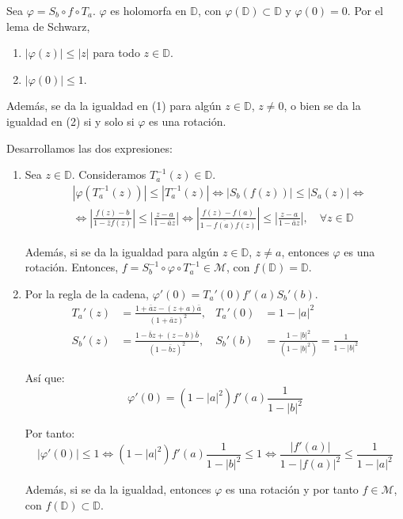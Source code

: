 Sea $\varphi = S_b \circ f \circ T_a$.
$\varphi$ es holomorfa en $\mathbb{D}$, con $\varphi(\mathbb{D}) \subset \mathbb{D}$ y $\varphi(0) = 0$.
Por el lema de Schwarz,
\begin{enumerate}
    \item $|\varphi(z)| \leq |z|$ para todo $z \in \mathbb{D}$.
    \item $|\varphi(0)| \leq 1$.
\end{enumerate}

Además, se da la igualdad en (1) para algún $z \in \mathbb{D}$, $z \neq 0$, o bien se da la igualdad en (2) si y solo si $\varphi$ es una rotación.

Desarrollamos las dos expresiones:
\begin{enumerate}
    \item Sea $z \in \mathbb{D}$.
          Consideramos $T_a^{-1}(z) \in \mathbb{D}$.
          \begin{align*}
               & |\varphi(T_a^{-1}(z))| \leq |T_a^{-1}(z)| \Leftrightarrow |S_b(f(z))| \leq |S_a(z)| \Leftrightarrow                                                                                                                                              \\
               & \Leftrightarrow \left|\frac{f(z)-b}{1-\bar{z}f(z)}\right| \leq \left|\frac{z-a}{1-\bar{a}z}\right| \Leftrightarrow \left|\frac{f(z)-f(a)}{1-\overline{f(a)}f(z)}\right| \leq \left|\frac{z-a}{1-\bar{a}z}\right|, \quad \forall z \in \mathbb{D}
          \end{align*}

          Además, si se da la igualdad para algún $z \in \mathbb{D}$, $z \neq a$, entonces $\varphi$ es una rotación.
          Entonces, $f = S_b^{-1} \circ \varphi \circ T_a^{-1} \in \mathcal{M}$, con $f(\mathbb{D}) = \mathbb{D}$.

    \item Por la regla de la cadena, $\varphi'(0) = T_a'(0) f'(a) S_b'(b)$.
          \begin{align*}
              T_a'(z) & = \frac{1 + \bar{a}z - (z+a)\bar{a}}{(1 + \bar{a}z)^2}, & T_a'(0) & = 1 - |a|^2                                     \\
              S_b'(z) & = \frac{1 - \bar{b}z + (z-b)\bar{b}}{(1 - \bar{b}z)^2}, & S_b'(b) & = \frac{1-|b|^2}{(1-|b|^2)} = \frac{1}{1-|b|^2}
          \end{align*}

          Así que:
          $$\varphi'(0) = (1-|a|^2)f'(a)\frac{1}{1-|b|^2}$$

          Por tanto:
          $$|\varphi'(0)| \leq 1 \Leftrightarrow (1-|a|^2)f'(a)\frac{1}{1-|b|^2} \leq 1 \Leftrightarrow \frac{|f'(a)|}{1-|f(a)|^2} \leq \frac{1}{1-|a|^2}$$

          Además, si se da la igualdad, entonces $\varphi$ es una rotación y por tanto $f \in \mathcal{M}$, con $f(\mathbb{D}) \subset \mathbb{D}$.
\end{enumerate}

